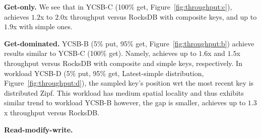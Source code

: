
{\bf Get-only.} 
We see that in YCSB-C (100\% get, Figure~\ref{fig:throughput:c}), 
\sys\/ achieves $1.2$x to $2.0$x throughput versus RocksDB with composite keys,
and up to $1.9$x  with simple ones.   

{\bf Get-dominated.} 
YCSB-B (5\% put, 95\% get, Figure~\ref{fig:throughput:b}) achieve results similar to YCSB-C (100\% get).
Namely, \sys\/ achieves up to $1.6$x and $1.5$x throughput versus RocksDB with composite and simple keys, respectively.   
In workload YCSB-D (5\% put, 95\% get, Latest-simple distribution, Figure~\ref{fig:throughput:d}), the sampled key's position wrt the most recent key is distributed Zipf. This
workload has medium spatial locality and thus exhibits similar trend to workload YCSB-B however, the gap is smaller, \sys\/ achieves up to $1.3$x throughput versus RocksDB.

{\bf Read-modify-write.} 

